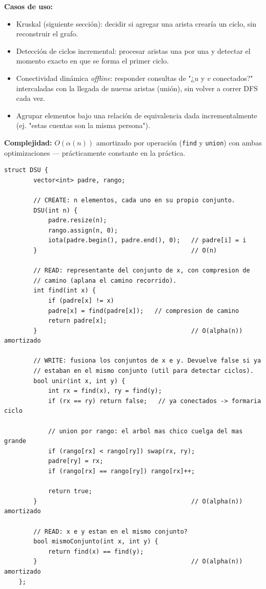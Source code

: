 \documentclass[10pt,a4paper,twocolumn]{article}
\begin{document}
\textbf{Casos de uso:}

\begin{itemize}
	\item Kruskal (siguiente sección): decidir si agregar una arista
	crearía un ciclo, sin reconstruir el grafo.
	\item Detección de ciclos incremental: procesar aristas una por
	una y detectar el momento exacto en que se forma el primer ciclo.
	\item Conectividad dinámica \textit{offline}: responder consultas
	de "¿$u$ y $v$ conectados?" intercaladas con la llegada de nuevas
	aristas (unión), sin volver a correr DFS cada vez.
	\item Agrupar elementos bajo una relación de equivalencia dada
	incrementalmente (ej. "estas cuentas son la misma persona").
\end{itemize}

\textbf{Complejidad:} $O(\alpha(n))$ amortizado por operación
(\texttt{find} y \texttt{union}) con ambas optimizaciones —
prácticamente constante en la práctica.

\begin{lstlisting}[style=cpp]
	struct DSU {
		vector<int> padre, rango;
		
		// CREATE: n elementos, cada uno en su propio conjunto.
		DSU(int n) {
			padre.resize(n);
			rango.assign(n, 0);
			iota(padre.begin(), padre.end(), 0);   // padre[i] = i
		}                                          // O(n)
		
		// READ: representante del conjunto de x, con compresion de
		// camino (aplana el camino recorrido).
		int find(int x) {
			if (padre[x] != x)
			padre[x] = find(padre[x]);   // compresion de camino
			return padre[x];
		}                                          // O(alpha(n)) amortizado
		
		// WRITE: fusiona los conjuntos de x e y. Devuelve false si ya
		// estaban en el mismo conjunto (util para detectar ciclos).
		bool unir(int x, int y) {
			int rx = find(x), ry = find(y);
			if (rx == ry) return false;   // ya conectados -> formaria ciclo
			
			// union por rango: el arbol mas chico cuelga del mas grande
			if (rango[rx] < rango[ry]) swap(rx, ry);
			padre[ry] = rx;
			if (rango[rx] == rango[ry]) rango[rx]++;
			
			return true;
		}                                          // O(alpha(n)) amortizado
		
		// READ: x e y estan en el mismo conjunto?
		bool mismoConjunto(int x, int y) {
			return find(x) == find(y);
		}                                          // O(alpha(n)) amortizado
	};
\end{lstlisting}
\end{document}
